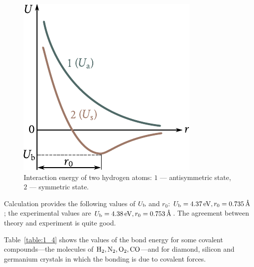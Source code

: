 \begin{figure}[t]
	\begin{center}
		\includegraphics[scale=1]{figures/ch_01/fig_1_7.pdf}
		\caption[]{Interaction energy of two hydrogen atoms: $1$ --- antisymmetric state, $2$ --- symmetric state.}
		\label{fig:1_7}
	\end{center}
	\vspace{-0.7cm}
\end{figure}

Calculation provides the following values of $U_{\text{b}}$ and $r_0$: $U_{\text{b}}=\SI{4.37}{\electronvolt}, r_0=\SI{0.735}{\angstrom}$; the experimental values are $U_{\text{b}}=\SI{4.38}{\electronvolt}, r_0=\SI{0.753}{\angstrom}$. The agreement between theory and experiment
is quite good.

Table~\ref{table:1_4} shows the values of the bond energy for some covalent compounds---the molecules of $\ce{H2}, \ce{N2}, \ce{O2}, \ce{CO}$---and for diamond, silicon and germanium crystals in which the bonding is due to covalent forces.

\begin{table}[!b]
	\renewcommand{\arraystretch}{1.2}
	\caption{}
	\vspace{-0.6cm}
	\label{table:1_4}
	\begin{center}\end{center}
\end{table}

